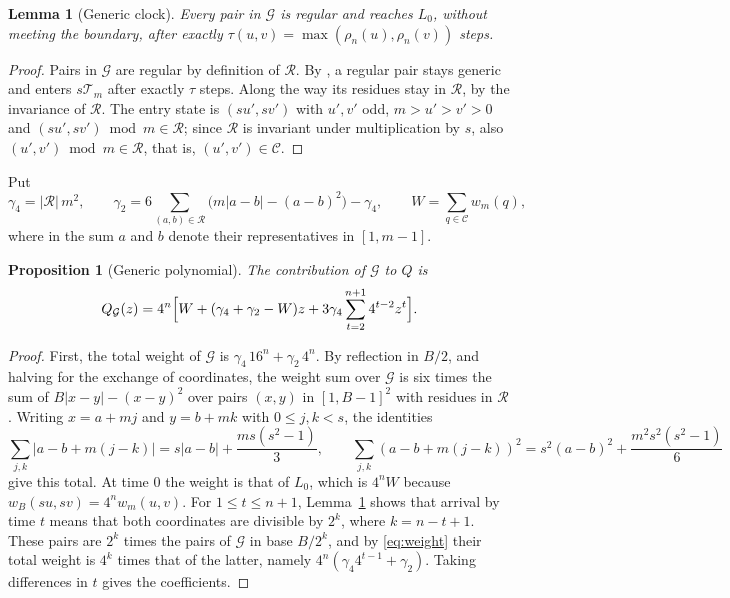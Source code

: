 \documentclass[11pt]{amsart}
\newtheorem{lemma}[theorem]{Lemma}
\newtheorem{proposition}[theorem]{Proposition}
\theoremstyle{remark}
\newcommand{\T}{\mathcal{T}}
\newcommand{\C}{\mathcal{C}}
\newcommand{\R}{\mathcal{R}}
\newcommand{\G}{\mathcal{G}}
\begin{document}
\begin{lemma}[Generic clock]\label{lem:generic}
Every pair in $\G$ is regular and reaches $L_0$, without meeting the boundary, after exactly $\tau(u,v)=\max(\rho_n(u),\rho_n(v))$ steps.
\end{lemma}

\begin{proof}
Pairs in $\G$ are regular by definition of $\R$. By \cite[Lemma~6]{G1}, a regular pair stays generic and enters $s\T_m$ after exactly $\tau$ steps. Along the way its residues stay in $\R$, by the invariance of $\R$. The entry state is $(su',sv')$ with $u',v'$ odd, $m>u'>v'>0$ and $(su',sv')\bmod m\in\R$; since $\R$ is invariant under multiplication by $s$, also $(u',v')\bmod m\in\R$, that is, $(u',v')\in\C$.
\end{proof}

Put
\[
\gamma_4=|\R|\,m^2,\qquad
\gamma_2=6\sum_{(a,b)\in\R}\bigl(m|a-b|-(a-b)^2\bigr)-\gamma_4,\qquad
W=\sum_{q\in\C}w_m(q),
\]
where in the sum $a$ and $b$ denote their representatives in $[1,m-1]$.

\begin{proposition}[Generic polynomial]\label{prop:generic}
The contribution of $\G$ to $Q$ is
\begin{equation}\label{eq:generic}
Q_\G(z)=4^n\Bigl[W+(\gamma_4+\gamma_2-W)z+3\gamma_4\sum_{t=2}^{n+1}4^{t-2}z^t\Bigr].
\end{equation}
\end{proposition}

\begin{proof}
First, the total weight of $\G$ is $\gamma_4\,16^n+\gamma_2\,4^n$. By reflection in $B/2$, and halving for the exchange of coordinates, the weight sum over $\G$ is six times the sum of $B|x-y|-(x-y)^2$ over pairs $(x,y)$ in $[1,B-1]^2$ with residues in $\R$. Writing $x=a+mj$ and $y=b+mk$ with $0\le j,k<s$, the identities
\[
\sum_{j,k}|a-b+m(j-k)|=s|a-b|+\frac{ms(s^2-1)}3,\qquad
\sum_{j,k}(a-b+m(j-k))^2=s^2(a-b)^2+\frac{m^2s^2(s^2-1)}6
\]
give this total. At time $0$ the weight is that of $L_0$, which is $4^nW$ because $w_B(su,sv)=4^nw_m(u,v)$. For $1\le t\le n+1$, Lemma~\ref{lem:generic} shows that arrival by time $t$ means that both coordinates are divisible by $2^k$, where $k=n-t+1$. These pairs are $2^k$ times the pairs of $\G$ in base $B/2^k$, and by \eqref{eq:weight} their total weight is $4^k$ times that of the latter, namely $4^n(\gamma_4 4^{t-1}+\gamma_2)$. Taking differences in $t$ gives the coefficients.
\end{proof}
\end{document}
